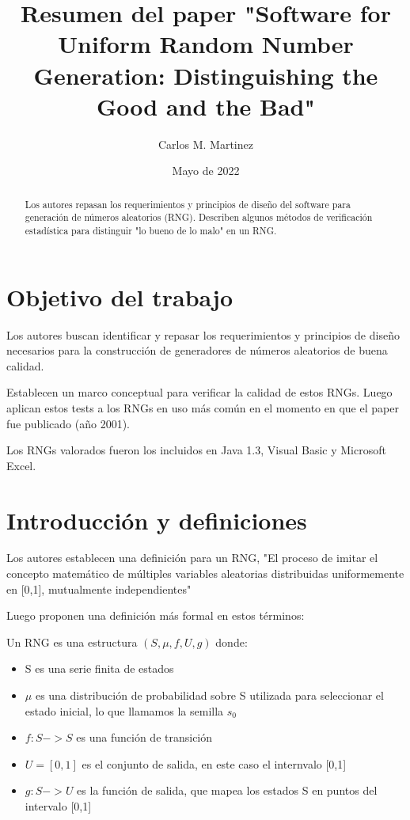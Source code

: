 \documentclass[11pt]{article}
\begin{document}
\title{Resumen del paper "Software for Uniform Random Number Generation: Distinguishing the Good and the Bad"}
\author{Carlos M. Martinez}
\date{Mayo de 2022}

\maketitle

\begin{abstract}
Los autores repasan los requerimientos y principios de diseño del software para generación de números aleatorios (RNG). Describen algunos métodos de verificación estadística para distinguir "lo bueno de lo malo" en un RNG.	
\end{abstract}

\section{Objetivo del trabajo}

Los autores buscan identificar y repasar los requerimientos y principios de diseño necesarios para la construcción de generadores de números aleatorios de buena calidad.

Establecen un marco conceptual para verificar la calidad de estos RNGs. Luego aplican estos tests a los RNGs en uso más común en el momento en que el paper fue publicado (año 2001). 

Los RNGs valorados fueron los incluidos en Java 1.3, Visual Basic y Microsoft Excel.

\section{Introducción y definiciones}

Los autores establecen una definición para un RNG, "El proceso de imitar el concepto matemático de múltiples variables aleatorias distribuidas uniformemente en [0,1], mutualmente independientes"

Luego proponen una definición más formal en estos términos:

Un RNG es una estructura $(S, \mu, f, U, g)$ donde:

\begin{itemize}
	\item S es una serie finita de estados
	\item $\mu$ es una distribución de probabilidad sobre S utilizada para seleccionar el estado inicial, lo que llamamos la semilla $s_0$
	\item $f: S -> S$ es una función de transición
	\item $U = [0,1]$ es el conjunto de salida, en este caso el internvalo [0,1]
	\item $g: S -> U$ es la función de salida, que mapea los estados S en puntos del intervalo [0,1]
\end{itemize}
\end{document}
